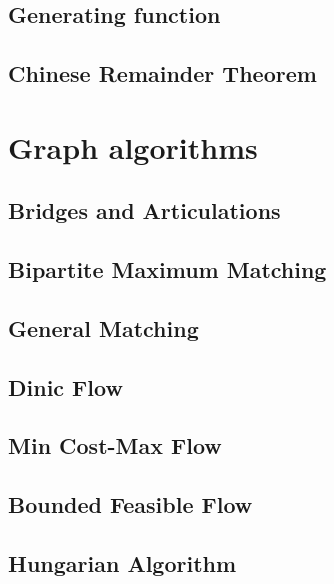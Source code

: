 \subsection{Generating function}
\raggedbottom
\hrulefill
\subsection{Chinese Remainder Theorem}
\raggedbottom
\hrulefill

\section{Graph algorithms}
\subsection{Bridges and Articulations}
\raggedbottom
\hrulefill
\subsection{Bipartite Maximum Matching}
\raggedbottom
\hrulefill
\subsection{General Matching}
\raggedbottom
\hrulefill
\subsection{Dinic Flow}
\raggedbottom
\hrulefill
\subsection{Min Cost-Max Flow}
\raggedbottom
\hrulefill
\subsection{Bounded Feasible Flow}
\raggedbottom
\hrulefill
\subsection{Hungarian Algorithm}
\raggedbottom
\hrulefill
